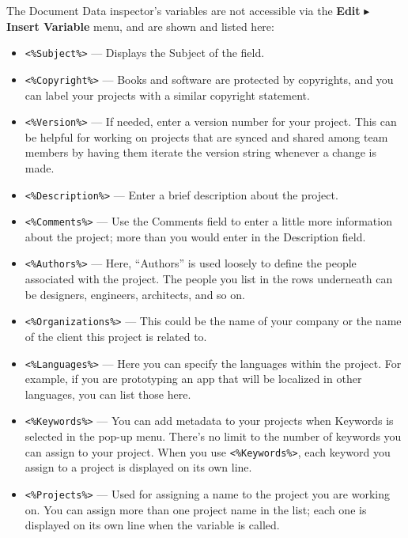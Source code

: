\documentclass[../main.tex]{subfiles}
\begin{document}
The Document Data inspector's variables are not accessible via the \textbf{Edit}
$\blacktriangleright$ \textbf{Insert Variable} menu, and are shown and listed here:


\begin{itemize}
  \item \texttt{<\%Subject\%>} --- Displays the Subject of the field.
  \item \texttt{<\%Copyright\%>} --- Books and software are protected by copyrights, and you can
    label your projects with a similar copyright statement.
  \item \texttt{<\%Version\%>} --- If needed, enter a version number for your project. This can
    be helpful for working on projects that are synced and shared among team members by having
    them iterate the version string whenever a change is made.
  \item \texttt{<\%Description\%>} --- Enter a brief description about the project.
  \item \texttt{<\%Comments\%>} --- Use the Comments field to enter a little more information
    about the project; more than you would enter in the Description field.
  \item \texttt{<\%Authors\%>} --- Here, ``Authors'' is used loosely to define the people
    associated with the project. The people you list in the rows underneath can be designers,
    engineers, architects, and so on.
  \item \texttt{<\%Organizations\%>} --- This could be the name of your company or the name of
    the client this project is related to.
  \item \texttt{<\%Languages\%>} --- Here you can specify the languages within the project. For
    example, if you are prototyping an app that will be localized in other languages, you can
    list those here.
  \item \texttt{<\%Keywords\%>} --- You can add metadata to your projects when Keywords is
    selected in the pop-up menu. There's no limit to the number of keywords you can assign to
    your project. When you use \texttt{<\%Keywords\%>}, each keyword you assign to a project is
    displayed on its own line.
  \item \texttt{<\%Projects\%>} --- Used for assigning a name to the project you are working on.
    You can assign more than one project name in the list; each one is displayed on its own line
    when the variable is called.
\end{itemize}
\end{document}
